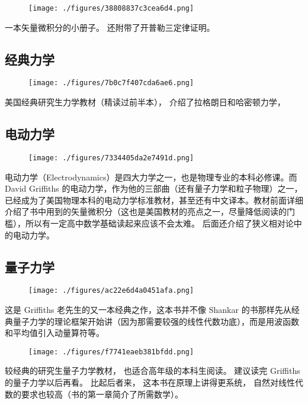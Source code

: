 \begin{figure}[ht]
\centering
\texttt{[image: ./figures/38808837c3cea6d4.png]}
\caption{} \label{fig_PhText_2}
\end{figure}
一本矢量微积分的小册子。 还附带了开普勒三定律证明。

\subsection{经典力学}

\begin{figure}[ht]
\centering
\texttt{[image: ./figures/7b0c7f407cda6ae6.png]}
\caption{} \label{fig_PhText_3}
\end{figure}
美国经典研究生力学教材（精读过前半本）， 介绍了拉格朗日和哈密顿力学，

\subsection{电动力学}
\begin{figure}[ht]
\centering
\texttt{[image: ./figures/7334405da2e7491d.png]}
\caption{} \label{fig_PhText_5}
\end{figure}
电动力学（Electrodynamics）是四大力学之一，也是物理专业的本科必修课。而 David Griffiths 的电动力学，作为他的三部曲（还有量子力学和粒子物理）之一，已经成为了美国物理本科的电动力学标准教材，甚至还有中文译本。教材前面详细介绍了书中用到的矢量微积分（这也是美国教材的亮点之一，尽量降低阅读的门槛），所以有一定高中数学基础读起来应该不会太难。 后面还介绍了狭义相对论中的电动力学。

\subsection{量子力学}
\begin{figure}[ht]
\centering
\texttt{[image: ./figures/ac22e6d4a0451afa.png]}
\caption{} \label{fig_PhText_6}
\end{figure}
这是 Griffiths 老先生的又一本经典之作，这本书并不像 Shankar 的书那样先从经典量子力学的理论框架开始讲（因为那需要较强的线性代数功底），而是用波函数和平均值引入动量算符等。

\begin{figure}[ht]
\centering
\texttt{[image: ./figures/f7741eaeb381bfdd.png]}
\caption{} \label{fig_PhText_8}
\end{figure}
较经典的研究生量子力学教材， 也适合高年级的本科生阅读。 建议读完 Griffiths 的量子力学以后再看。 比起后者来， 这本书在原理上讲得更系统， 自然对线性代数的要求也较高（书的第一章简介了所需数学）。
